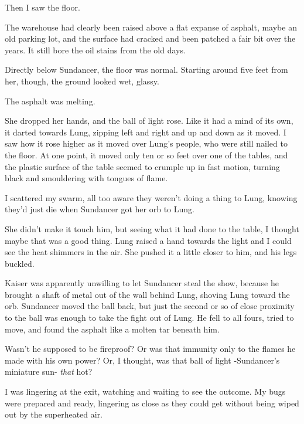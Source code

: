 Then I saw the floor.



The warehouse had clearly been raised above a flat expanse of asphalt, maybe an old parking lot, and the surface had cracked and been patched a fair bit over the years.  It still bore the oil stains from the old days.



Directly below Sundancer, the floor was normal.  Starting around five feet from her, though, the ground looked wet, glassy.



The asphalt was melting.



She dropped her hands, and the ball of light rose.  Like it had a mind of its own, it darted towards Lung, zipping left and right and up and down as it moved.  I saw how it rose higher as it moved over Lung's people, who were still nailed to the floor.  At one point, it moved only ten or so feet over one of the tables, and the plastic surface of the table seemed to crumple up in fast motion, turning black and smouldering with tongues of flame.



I scattered my swarm, all too aware they weren't doing a thing to Lung, knowing they'd just die when Sundancer got her orb to Lung.



She didn't make it touch him, but seeing what it had done to the table, I thought maybe that was a good thing.  Lung raised a hand towards the light and I could see the heat shimmers in the air.  She pushed it a little closer to him, and his legs buckled.



Kaiser was apparently unwilling to let Sundancer steal the show, because he brought a shaft of metal out of the wall behind Lung, shoving Lung toward the orb.  Sundancer moved the ball back, but just the second or so of close proximity to the ball was enough to take the fight out of Lung.  He fell to all fours, tried to move, and found the asphalt like a molten tar beneath him.



Wasn't he supposed to be fireproof?  Or was that immunity only to the flames he made with his own power?  Or, I thought, was that ball of light -Sundancer's miniature sun- \emph{that }hot?



I was lingering at the exit, watching and waiting to see the outcome.  My bugs were prepared and ready, lingering as close as they could get without being wiped out by the superheated air.



